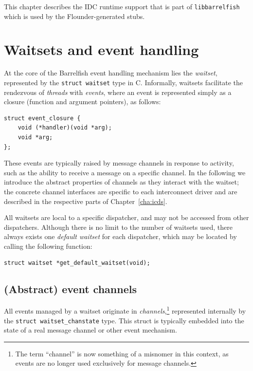 \documentclass[a4paper,twoside]{report} %
\begin{document}
This chapter describes the IDC runtime support that is part of
\texttt{libbarrelfish} which is used by the Flounder-generated stubs.

\section{Waitsets and event handling}
\label{sec:waitset}

At the core of the Barrelfish event handling mechanism lies the \emph{waitset},
represented by the \lstinline+struct waitset+ type in C. Informally, waitsets
facilitate the rendezvous of \emph{threads} with \emph{events}, where an event
is represented simply as a closure (function and argument pointers), as follows:

\begin{lstlisting}
struct event_closure {
    void (*handler)(void *arg);
    void *arg;
};
\end{lstlisting}

These events are typically raised by message channels in response to activity,
such as the ability to receive a message on a specific channel. In the
following we introduce the abstract properties of channels as they interact
with the waitset; the concrete channel interfaces are specific to each
interconnect driver and are described in the respective parts of
Chapter~\ref{cha:icds}.

All waitsets are local to a specific dispatcher, and may not be accessed from
other dispatchers. Although there is no limit to the number of waitsets used,
there always exists one \emph{default waitset} for each dispatcher, which
may be located by calling the following function:

\begin{lstlisting}
struct waitset *get_default_waitset(void);
\end{lstlisting}


\subsection{(Abstract) event channels}

All events managed by a waitset originate in \emph{channels},\footnote{The
term ``channel'' is now something of a misnomer in this context, as events are
no longer used exclusively for message channels.} represented internally by the
\lstinline+struct waitset_chanstate+ type. This struct is typically embedded
into the state of a real message channel or other event mechanism.
\end{document}
